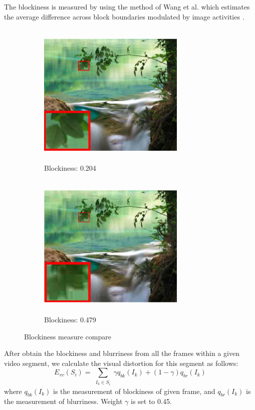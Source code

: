 \documentclass[12pt]{article}
\begin{document}
\par
The blockiness is measured by using the method of Wang et al. which estimates the average difference across block boundaries modulated by image activities \cite{Wang}.
\begin{figure}[h]
	\begin{subfigure}[h]{0.49 \textwidth}
	\centering
	\includegraphics[width=7cm, height=7cm]{a1}
	\caption{Blockiness: 0.204}
	\label{default}
	\end{subfigure}
	\hspace{1cm}
	\begin{subfigure}[h]{0.49 \textwidth}
	\centering
	\includegraphics[width=7cm, height=7cm]{b1}
	\caption{Blockiness: 0.479}
	\label{default}
	\end{subfigure}
\caption{Blockiness measure compare}
\end{figure}

After obtain the blockiness and blurriness from all the frames within a given video segment, we calculate the visual distortion for this segment as follows:
\begin{equation}
\mathit{E_{vv}(S_i)} = \sum_{\substack{\mathit{I_k\in S_i}}}\gamma \mathit{q_{bk}(I_k)} + (1 - \gamma)\mathit{q_{br}(I_k)}
\end{equation} 
where $\mathit{q_{bk}(I_k)}$ is the measurement of blockiness of given frame, and $\mathit{q_{br}(I_k)}$ is the measurement of blurriness. Weight $\gamma$ is set to 0.45.
\end{document}
